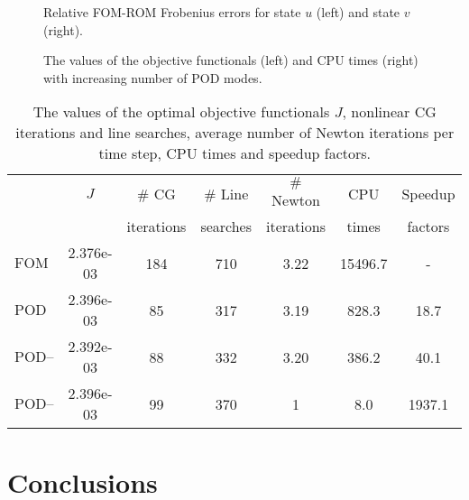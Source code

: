 \documentclass[preprint,12pt]{elsarticle}
\begin{document}
\begin{figure}[htb]
\centering
   \caption{Relative FOM-ROM Frobenius errors for state $u$ (left) and  state $v$ (right).}
   \label{fig:errors}
\end{figure}


\begin{figure}[htb]
\centering
   \caption{The values of the objective functionals (left) and CPU times (right) with increasing number of POD modes.}
   \label{fig:cpu}
\end{figure}

\begin{table}[htb]
\centering
\begin{tabular}{l|c|c|c|c|c|c}
                    & $J$       & $\#$ CG   & $\#$ Line   &  $\#$Newton    & CPU   &  Speedup    \\
                    &         & iterations  &  searches  &   iterations   &  times  &   factors   \\
\hline
  $\text{FOM }$     & 2.376e-03    &  184   &  710   &  3.22   & 15496.7  &    -     \\
  $\text{POD}$      & 2.396e-03    &  85    &  317   &  3.19   & 828.3    &   18.7  \\
  $\text{POD--DEIM}$ & 2.392e-03    &  88    &  332   &  3.20   & 386.2    &   40.1  \\
  $\text{POD--DMD}$  & 2.396e-03    &  99    &  370   &   1     & 8.0      &   1937.1 \\
\hline
\end{tabular}
\caption{The values of the optimal objective functionals $J$, nonlinear CG iterations and line searches, average number of Newton iterations per time step, CPU times and speedup factors.}
\label{table:all}
\end{table}


\clearpage
\section{Conclusions}
\label{conc}
\end{document}
